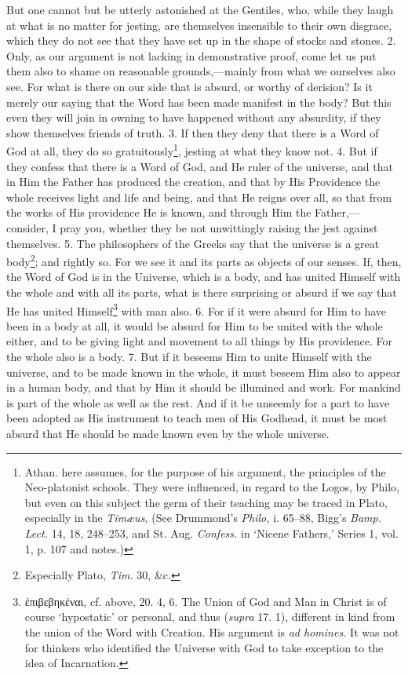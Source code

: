 But one cannot but be utterly astonished at the Gentiles, who, while they laugh at what is no matter for jesting, are themselves insensible to their own disgrace, which they do not see that they have set up in the shape of stocks and stones. 2. Only, as our argument is not lacking in demonstrative proof, come let us put them also to shame on reasonable grounds,—mainly from what we ourselves also see. For what is there on our side that is absurd, or worthy of derision? Is it merely our saying that the Word has been made manifest in the body? But this even they will join in owning to have happened without any absurdity, if they show themselves friends of truth. 3. If then they deny that there is a Word of God at all, they do so gratuitously\footnote{Athan. here assumes, for the purpose of his argument, the principles of the Neo-platonist schools. They were influenced, in regard to the Logos, by Philo, but even on this subject the germ of their teaching may be traced in Plato, especially in the \emph{Timæus,} (See Drummond’s \emph{Philo,} i. 65–88, Bigg’s \emph{Bamp. Lect.} 14, 18, 248–253, and St. Aug. \emph{Confess.} in ‘Nicene Fathers,’ Series 1, vol. 1, p. 107 and notes.)}, jesting at what they know not. 4. But if they confess that there is a Word of God, and He ruler of the universe, and that in Him the Father has produced the creation, and that by His Providence the whole receives light and life and being, and that He reigns over all, so that from the works of His providence He is known, and through Him the Father,—consider, I pray you, whether they be not unwittingly raising the jest against themselves. 5. The philosophers of the Greeks say that the universe is a great body\footnote{Especially Plato, \emph{Tim.} 30, \&c.}; and rightly so. For we see it and its parts as objects of our senses. If, then, the Word of God is in the Universe, which is a body, and has united Himself with the whole and with all its parts, what is there surprising or absurd if we say that He has united Himself\footnote{\textgreek{ἐπιβεβηκέναι}, cf. above, 20. 4, 6. The Union of God and Man in Christ is of course ‘hypostatic’ or personal, and thus (\emph{supra} 17. 1), different in kind from the union of the Word with Creation. His argument is \emph{ad homines.} It was not for thinkers who identified the Universe with God to take exception to the idea of Incarnation.} with man also. 6. For if it were absurd for Him to have been in a body at all, it would be absurd for Him to be united with the whole either, and to be giving light and movement to all things by His providence. For the whole also is a body. 7. But if it beseems Him to unite Himself with the universe, and to be made known in the whole, it must beseem Him also to appear in a human body, and that by Him it should be illumined and work. For mankind is part of the whole as well as the rest. And if it be unseemly for a part to have been adopted as His instrument to teach men of His Godhead, it must be most absurd that He should be made known even by the whole universe.


